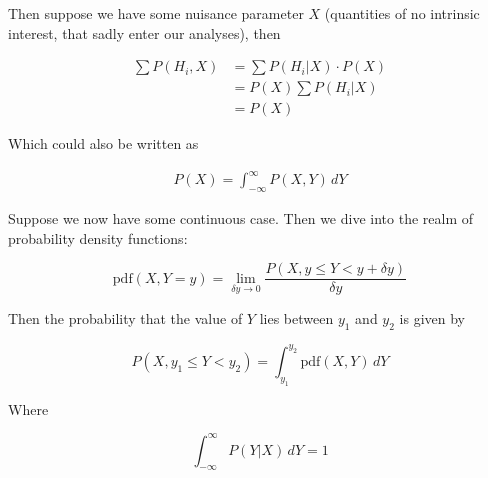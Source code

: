\documentclass[a4paper]{article}
\begin{document}
Then suppose we have some nuisance parameter $X$ (quantities of no intrinsic interest, that sadly enter our analyses), then 

\begin{align}
	\sum P(H_i,X) &= \sum P(H_i|X)\cdot P(X)\\[1em]
	&= P(X)\sum P(H_i|X)\\[1em]
	&= P(X)
\end{align}

Which could also be written as

\begin{align}
	P(X)=\int_{-\infty}^{\infty} P(X,Y)\,dY
\end{align}

Suppose we now have some continuous case. Then we dive into the realm of probability density functions:

\begin{equation}
	\text{pdf}(X, Y=y) = \lim_{\delta y\rightarrow 0} \frac{P(X, y\le Y < y+\delta y)}{\delta y}
\end{equation} 

Then the probability that the value of $Y$ lies between $y_1$ and $y_2$ is given by

\begin{equation}
	P(X, y_1\le Y < y_2)=\int_{y_1}^{y_2}\text{pdf}(X, Y)\,dY
\end{equation}

Where 

\begin{equation}
	\int_{-\infty}^{\infty} P(Y|X)\,dY = 1
\end{equation}
\end{document}

